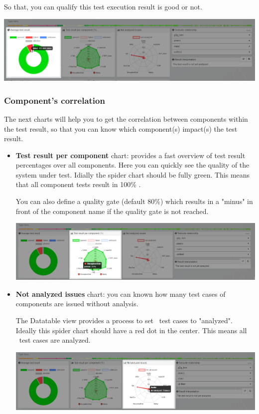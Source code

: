So that, you can qualify this test execution result is good or not.

\includegraphics[width=1\linewidth]
{./pictures/dashboard/chart_average_test_result.png}

\subsubsection{Component's correlation}
The next charts will help you to get the correlation between components within
the test result, so that you can know which component(s) impact(s) the test
result.

\begin{itemize}
\item \textbf{Test result per component} chart: provides a fast overview of 
test result percentages over all components. Here you can quickly see
the quality of the system under test. Idially the spider chart should
be fully green. This means that all component tests result in 100\% \passed.

You can also define a quality gate (default 80\%) which results in a "minus"
in front of the component name if the quality gate is not reached.


\includegraphics[width=1\linewidth]
{./pictures/dashboard/chart_test_result_per_component.png}


\item \textbf{Not analyzed issues} chart: you can known how many test cases of 
components are issued without analysis. 

The Datatable view provides a process to set \failed\ test cases to
"analyzed". Ideally this spider chart should have a red dot in the center.
This means all \failed\ test cases are analyzed.

\includegraphics[width=1\linewidth]
{./pictures/dashboard/chart_not_analyzed_issues.png}
\end{itemize}

